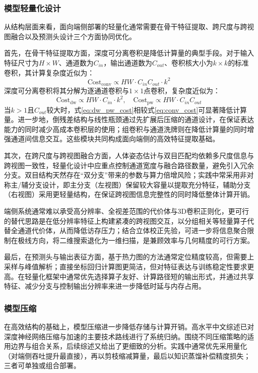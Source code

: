 \subsubsection{模型轻量化设计}
从结构层面来看，面向端侧部署的轻量化通常需要在骨干特征提取、跨尺度与跨视图融合以及预测头设计三个方面协同优化。

首先，在骨干特征提取方面，深度可分离卷积是降低计算量的典型手段。对于输入特征尺寸为$H\times W$、通道数为$C_{in}$，输出通道数为$C_{out}$、卷积核大小为$k\times k$的标准卷积，其计算复杂度近似为：
\begin{equation}
\text{Cost}_{\text{conv}} \propto H W \cdot C_{in} C_{out} \cdot k^2
\label{eq:conv_cost}
\end{equation}
深度可分离卷积将其分解为逐通道卷积与$1\times 1$点卷积，复杂度近似为：
\begin{equation}
\text{Cost}_{\text{dw}} \propto H W \cdot C_{in}\cdot k^2,\quad
\text{Cost}_{\text{pw}} \propto H W \cdot C_{in} C_{out}
\label{eq:dw_pw_cost}
\end{equation}
当$k>1$且$C_{out}$较大时，式\ref{eq:dw_pw_cost}相较式\ref{eq:conv_cost}可显著降低计算量。进一步地，倒残差结构与线性瓶颈通过先扩展后压缩的通道设计，在保证表达能力的同时减少高成本卷积层的使用；组卷积与通道洗牌则在降低计算量的同时增强通道间信息交互。这些模块共同构成面向端侧的高效特征提取基础。

其次，在跨尺度与跨视图融合方面，人体姿态估计与双目匹配均依赖多尺度信息与跨视图一致性，轻量化设计中应重点控制通道宽度与融合路径数量，避免引入冗余分支。双目结构天然存在“双分支”带来的参数与算力倍增风险；实践中常采用非对称主/辅分支设计，即主分支（左视图）保留较大容量以提取充分特征，辅助分支（右视图）采用更轻量结构，在保证跨视图信息完整性的同时降低整体计算开销。

端侧系统通常难以承受高分辨率、全视差范围的代价体与3D卷积正则化，更可行的替代思路是在低分辨率特征上构建紧凑的跨视图交互，以分组相关等轻量算子代替全通道代价体，从而降低访存压力；结合立体校正先验，可进一步将信息聚合限制在极线方向，将二维搜索退化为一维扫描，是兼顾效率与几何精度的可行方案。

最后，在预测头与输出表征方面，基于热力图的方法通常定位精度较高，但需要上采样与峰值解析；直接坐标回归计算图更简洁，但对特征表达与训练稳定性要求更高。在轻量化框架中通常优先选择算子友好、计算路径短的输出形式，并通过共享特征、减少分支与控制输出分辨率来进一步降低时延与内存占用。

\subsubsection{模型压缩}
在高效结构的基础上，模型压缩进一步降低存储与计算开销。高水平中文综述已对深度神经网络压缩与加速的主要技术路线进行了系统归纳。围绕不同压缩策略的适用边界与组合关系，后续综述又给出了更细致的分析。实践中通常优先采用量化（对端侧吞吐提升最直接），再以剪枝缩减算量，最后以知识蒸馏补偿精度损失；三者可单独或组合部署。


